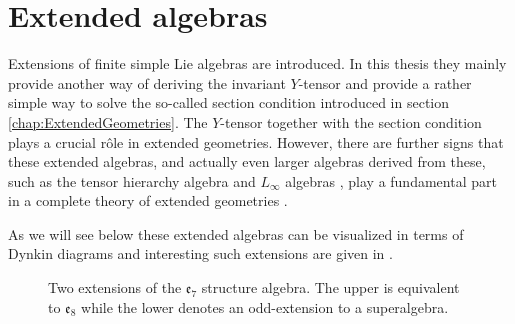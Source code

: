\section{Extended algebras\label{sec:ExtendedAlgebras}}
Extensions of finite simple Lie algebras are introduced. In this thesis they mainly provide another way of deriving the invariant $Y$-tensor and provide a rather simple way to solve the so-called section condition introduced in section \ref{chap:ExtendedGeometries}. The $Y$-tensor together with the section condition plays a crucial rôle in extended geometries. However, there are further signs that these extended algebras, and actually even larger algebras derived from these, such as the tensor hierarchy algebra \cite{Palmkvist:2013vya} and $L_\infty$ algebras \cite{Cederwall:2018aab}, play a fundamental part in a complete theory of extended geometries \cite{Cederwall:2018aab}.

As we will see below these extended algebras can be visualized in terms of Dynkin diagrams and interesting such extensions are given in .
\begin{figure}
    \centering
    \ExtendedDynkin
    \caption{Two extensions of the $\mathfrak{e}_7$ structure algebra. The upper is equivalent to $\mathfrak{e}_8$ while the lower denotes an odd-extension to a superalgebra.}
    \label{fig:ExtendedDynk}
\end{figure}

